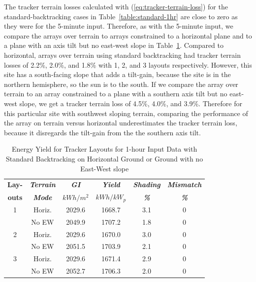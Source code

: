 \documentclass[conference]{IEEEtran}
\begin{document}
The tracker terrain losses calculated with (\ref{eq:tracker-terrain-loss}) for the standard-backtracking cases in Table~\ref{table:standard-1hr} are close to zero as they were for the 5-minute input. Therefore, as with the 5-minute input, we compare the arrays over terrain to arrays constrained to a horizontal plane and to a plane with an axis tilt but no east-west slope in Table~\ref{table:no-east-west-5min}. Compared to horizontal, arrays over terrain using standard backtracking had tracker terrain losses of 2.2\%, 2.0\%, and 1.8\% with 1, 2, and 3 layouts respectively. However, this site has a south-facing slope that adds a tilt-gain, because the site is in the northern hemisphere, so the sun is to the south. If we compare the array over terrain to an array constrained to a plane with a southern axis tilt but no east-west slope, we get a tracker terrain loss of 4.5\%, 4.0\%, and 3.9\%. Therefore for this particular site with southwest sloping terrain, comparing the performance of the array on terrain versus horizontal underestimates the tracker terrain loss, because it disregards the tilt-gain from the the southern axis tilt.

\begin{table}[htbp]
\caption{Energy Yield for Tracker Layouts for 1-hour Input Data with Standard Backtracking on Horizontal Ground or Ground with no East-West slope}
\begin{center}
\begin{tabular}{|c|c|c|c|c|c|}
\hline
\textbf{Lay-}& \textbf{\textit{Terrain}}& \textbf{\textit{GI}}&        \textbf{\textit{Yield}}&        \textbf{\textit{Shading}}& \textbf{\textit{Mismatch}} \\
\textbf{outs}& \textbf{\textit{Mode}}&    \textbf{\textit{$kWh/m^2$}}& \textbf{\textit{$kWh / kW_p$}}& \textbf{\textit{\%}}&      \textbf{\textit{\%}} \\
\hline
1& Horiz.& 2029.6&  1668.7& 3.1& 0 \\
 & No EW & 2049.9&  1707.2& 1.8& 0 \\
\hline
2& Horiz.& 2029.6&  1670.0& 3.0& 0 \\
 & No EW & 2051.5&  1703.9& 2.1& 0 \\
\hline
3& Horiz.& 2029.6&  1671.4& 2.9& 0 \\
 & No EW & 2052.7&  1706.3& 2.0& 0 \\
\hline
\end{tabular}
\label{table:no-east-west-5min}
\end{center}
\end{table}
\end{document}
